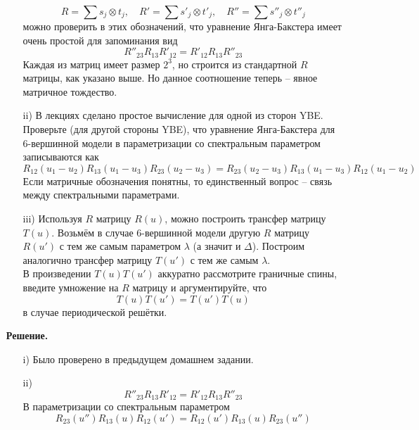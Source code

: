 \documentclass[12pt]{article}
\theoremstyle{definition}
\begin{document}
\begin{enumerate}
\begin{itemize}
\begin{equation}
            R=\sum s_j\otimes t_j,\quad R'=\sum s'_j\otimes t'_j,\quad R''=\sum s''_j\otimes t''_j
        \end{equation}
        можно проверить в этих обозначений, что уравнение Янга-Бакстера имеет очень простой для запоминания вид
        \begin{equation}
            R''_{23}R_{13}R'_{12}=R'_{12}R_{13}R''_{23}
        \end{equation}
        Каждая из матриц имеет размер $2^3$, но строится из стандартной $R$ матрицы, как указано выше. Но данное соотношение теперь -- явное матричное тождество.
        \item[ii)] В лекциях сделано простое вычисление для одной из сторон YBE. Проверьте (для другой стороны YBE), что уравнение Янга-Бакстера для 6-вершинной модели в параметризации со спектральным параметром записываются как
        \begin{equation}
            R_{12}(u_1-u_2)R_{13}(u_1-u_3)R_{23}(u_2-u_3)=R_{23}(u_2-u_3)R_{13}(u_1-u_3)R_{12}(u_1-u_2)
        \end{equation}
        Если матричные обозначения понятны, то единственный вопрос -- связь между спектральными параметрами.
        \item[iii)] Используя $R$ матрицу $R(u)$, можно построить трансфер матрицу $T(u)$. Возьмём в случае 6-вершинной модели другую $R$ матрицу $R(u')$ с тем же самым параметром $\lambda$ (а значит и $\Delta$). Построим аналогично трансфер матрицу $T(u')$ с тем же самым $\lambda$.\\
        В произведении $T(u)T(u')$ аккуратно рассмотрите граничные спины, введите умножение на $R$ матрицу и аргументируйте, что 
        \begin{equation}
            T(u)T(u')=T(u')T(u)
        \end{equation}
        в случае периодической решётки.
    \end{itemize}
    \textbf{Решение.}
    \begin{itemize}
        \item[i)] Было проверено в предыдущем домашнем задании. \item[ii)]
        \begin{equation}
            R''_{23}R_{13}R'_{12}=R'_{12}R_{13}R''_{23}
        \end{equation}
        В параметризации со спектральным параметром
        \begin{equation}
            R_{23}(u'')R_{13}(u)R_{12}(u')=R_{12}(u')R_{13}(u)R_{23}(u'')
        \end{equation}

\end{itemize}
\end{enumerate}
\end{document}
